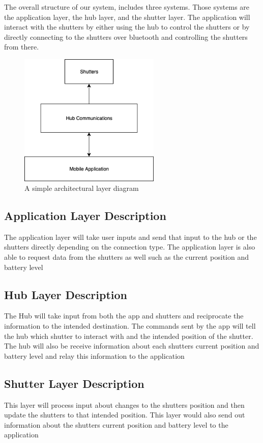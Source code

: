 The overall structure of our system, includes three systems. Those systems are the application layer, the hub layer, and the shutter layer. The application will interact with the shutters by either using the hub to control the shutters or by directly connecting to the shutters over bluetooth and controlling the shutters from there.

\begin{figure}[h!]
	\centering
 	\includegraphics[width=0.60\textwidth]{images/High_Level}
 \caption{A simple architectural layer diagram}
\end{figure}

\subsection{Application Layer Description}
The application layer will take user inputs and send that input to the hub or the shutters directly depending on the connection type. The application layer is also able to request data from the shutters as well such as the current position and battery level 

\subsection{Hub Layer Description}
The Hub will take input from both the app and shutters and reciprocate the information to the intended destination. The commands sent by the app will tell the hub which shutter to interact with and the intended position of the shutter. The hub will also be receive information about each shutters current position and battery level and relay this information to the application

\subsection{Shutter Layer Description}
This layer will process input about changes to the shutters position and then update the shutters to that intended position. This layer would also send out information about the shutters current position and battery level to the application